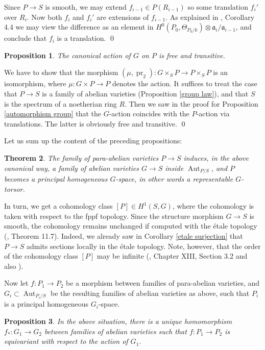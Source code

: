 \documentclass[oneside, 12pt]{amsart}
\newcommand\mylabel[1]{\label{#1}\marginpar{\raggedright\vspace{-1ex}\medskip\medskip\footnotesize \tt #1}}
\renewcommand\mylabel[1]{\label{#1}}
\newtheorem{theorem}{Theorem}[section]
\newtheorem{proposition}[theorem]{Proposition}
\theoremstyle{definition}
\theoremstyle{remark}
\newcommand{\ideala}{\mathfrak{a}}
\newcommand{\Aut}{\operatorname{Aut}}
\newcommand{\pr}{\operatorname{pr}}
\newcommand{\ra}{\rightarrow}
\begin{document}
Since $P\ra S$ is smooth, we may extend $f_{i-1}\in P(R_{i-1})$ so some translation $f_i'$ over $R_i$.
Now both $f_i$ and $f_i'$  are extensions of $f_{i-1}$. 
As explained in \cite{Talpo; Vistoli 2013}, Corollary 4.4 we may view the difference as an  element in $H^0(P_0,\Theta_{P_0/k})\otimes \ideala_i/\ideala_{i-1}$,
and conclude that $f_i$   is  a translation.
\qed

\begin{proposition}
\mylabel{free and transitive}
The canonical action of $G$ on $P$ is free and transitive.
\end{proposition}

\proof
We have to show that the morphism $(\mu,\pr_2):G\times_S P\ra P\times_SP$ is an isomorphism, where
$\mu:G\times P\ra P$ denotes the action. 
It 
suffices to treat the case that $P\ra S$ is a family of abelian varieties (Proposition \ref{group law}), and that $S$ is the spectrum of 
a noetherian ring $R$.
Then we saw in the proof for Proposition \ref{automorphism group} that the $G$-action coincides with the $P$-action via
translations. The latter is obviously free and transitive.
\qed

\medskip
Let us sum up the content of the preceding propositions:

\begin{theorem}
\mylabel{para-abelian becomes torsor}
The  family of para-abelian varieties $P\ra S$ induces, in the above canonical way, a family of abelian varieties $G\ra S$
inside $\Aut_{P/S}$, and $P$ becomes a  principal homogeneous $G$-space, in other words a  representable $G$-torsor.
\end{theorem}

In turn, we get a cohomology class $[P]\in H^1(S,G)$, where the cohomology is taken with respect to
the fppf topology.  Since the structure morphism $G\ra S$ is smooth, the cohomology  remains unchanged if computed with the \'etale
topology (\cite{GB III}, Theorem 11.7). Indeed, we already saw in Corollary \ref{etale surjection} 
that $P\ra S$ admits sections locally in the \'etale topology.
Note, however,  that the order of the cohomology class $[P]$ may be infinite (\cite{Raynaud 1970}, Chapter XIII, Section 3.2
and also \cite{Zomervrucht 2015}).

Now let $f:P_1\ra P_2$ be a morphism  between families of para-abelian varieties, and $G_i\subset\Aut_{P_i/S}$
be the resulting families of abelian varieties as above, such that  $P_i$ is a principal homogeneous $G_i$-space.
 
\begin{proposition}
In the above situation, there is a unique homomorphism $f_*:G_1\ra G_2$ between families of abelian varieties
such that $f:P_1\ra P_2$ is equivariant with respect to the action of $G_1$.   
\end{proposition}
\end{document}
